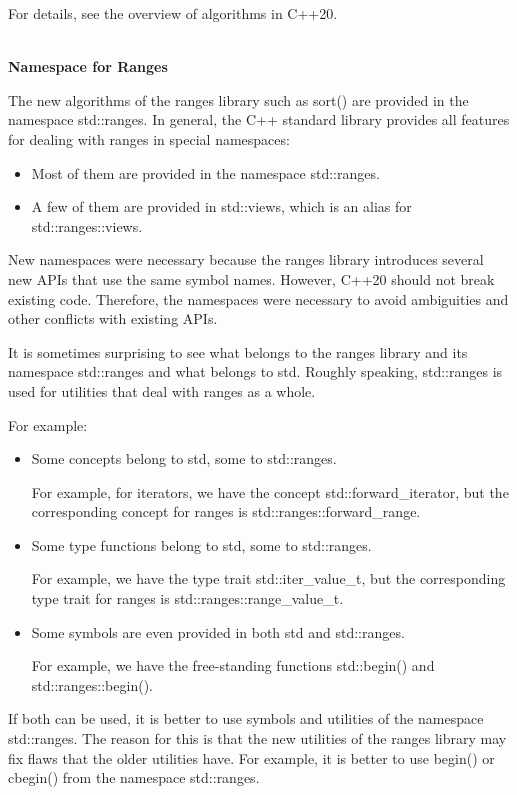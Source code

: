 For details, see the overview of algorithms in C++20.

\noindent
\hspace*{\fill} \\ %
\textbf{Namespace for Ranges}

The new algorithms of the ranges library such as sort() are provided in the namespace std::ranges. In general, the C++ standard library provides all features for dealing with ranges in special namespaces:

\begin{itemize}
\item
Most of them are provided in the namespace std::ranges.

\item
A few of them are provided in std::views, which is an alias for std::ranges::views.
\end{itemize}

New namespaces were necessary because the ranges library introduces several new APIs that use the same symbol names. However, C++20 should not break existing code. Therefore, the namespaces were necessary to avoid ambiguities and other conflicts with existing APIs.

It is sometimes surprising to see what belongs to the ranges library and its namespace std::ranges and what belongs to std. Roughly speaking, std::ranges is used for utilities that deal with ranges as a whole.

For example:

\begin{itemize}
\item
Some concepts belong to std, some to std::ranges.

For example, for iterators, we have the concept std::forward\_iterator, but the corresponding concept for ranges is std::ranges::forward\_range.

\item
Some type functions belong to std, some to std::ranges.

For example, we have the type trait std::iter\_value\_t, but the corresponding type trait for ranges is std::ranges::range\_value\_t.

\item
Some symbols are even provided in both std and std::ranges.

For example, we have the free-standing functions std::begin() and std::ranges::begin().
\end{itemize}

If both can be used, it is better to use symbols and utilities of the namespace std::ranges. The reason for this is that the new utilities of the ranges library may fix flaws that the older utilities have. For example, it is better to use begin() or cbegin() from the namespace std::ranges.

